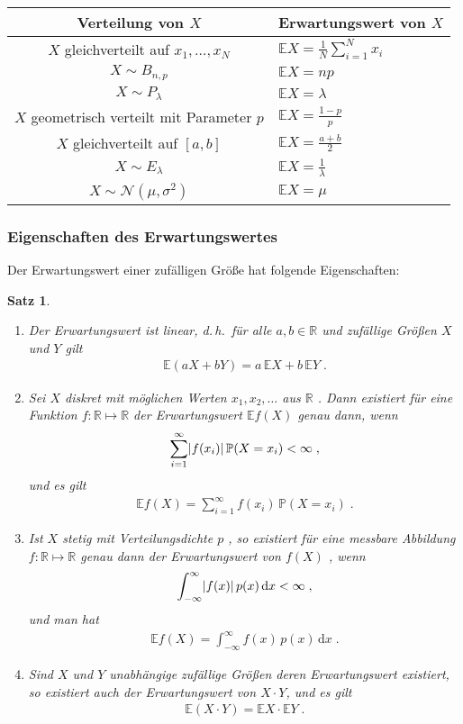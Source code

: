 \documentclass[ngerman,draft,parskip=half,twoside]{scrartcl}
\newtheorem{thm}{Satz}[section]
\DeclarePairedDelimiter{\abs}{\lvert}{\rvert}
\newcommand*{\R}{\mathbb{R}}      %
\newcommand*{\E}{\mathbb{E}}        %
\newcommand*{\WKM}{\mathbb{P}}      %
\begin{document}
{\renewcommand{\arraystretch}{1.4}
\begin{center}
\begin{tabular}{|c|l|}\hline
\bf Verteilung von $X$& \bf Erwartungswert von $X$\\ \hline\hline
$X$ gleichverteilt auf $x_1,\ldots,x_N$& $\E X=\frac{1}{N}\sum_{i=1}^N x_i$\\ \hline
$X\sim B_{n,p}$& $\E X= n p$\\ \hline
$X\sim P_\lambda$&$\E X= \lambda$\\ \hline
$X$ geometrisch verteilt mit Parameter $p$& $\E X = \frac{1-p}{p}$\\ \hline
$X$ gleichverteilt auf $[a,b]$& $\E X= \frac{a+b}{2}$\\ \hline
$X\sim E_\lambda$& $\E X = \frac{1}{\lambda}$\\ \hline
$X\sim \mathcal N(\mu,\sigma^2)$&$ \E X = \mu$\\ \hline
\end{tabular}
\end{center}
}
\subsubsection{Eigenschaften des Erwartungswertes}
Der Erwartungswert einer zufälligen Größe hat folgende Eigenschaften:
\begin{thm}~
\begin{enumerate}
\item
Der Erwartungswert ist linear, d.\,h.~für alle $a,b\in\R$ und zufällige Größen $X$ und $Y$
gilt
  \begin{gather*}
    \E(a X+ b Y) = a\,\E X + b\, \E Y\;.
  \end{gather*}
\item
Sei  $X$ diskret mit möglichen Werten $x_1,x_2,\ldots$ aus $\R$ .
Dann existiert für eine Funktion $f \colon\R\mapsto\R$
der Erwartungswert $\E f(X)$ genau dann, wenn
  \begin{gather*}
    \sum_{i=1}^\infty \abs{f(x_i)}\,\WKM(X=x_i)<\infty\;,
  \end{gather*}
und es gilt
  \begin{gather*}
    \E f(X)=\sum_{i=1}^\infty f(x_i)\,\WKM(X=x_i)\;.
  \end{gather*}
\item
Ist $X$ stetig mit Verteilungsdichte $p$ , so existiert für eine messbare
Abbildung $f \colon\R\mapsto\R$ genau dann der Erwartungswert von $f(X)$ , wenn
  \begin{gather*}
    \int_{-\infty}^\infty \abs{f(x)}\,p(x)\,\mathrm d x<\infty\;,
  \end{gather*}
und man hat
  \begin{gather*}
    \E f(X)=\int_{-\infty}^\infty  f(x) \,p(x)\,\mathrm d x\;.
  \end{gather*}
\item
Sind $X$ und $Y$ unabhängige zufällige Größen deren Erwartungswert existiert,
so existiert auch der Erwartungswert von $X\cdot Y$, und es gilt
  \begin{gather*}
    \E(X\cdot Y)= \E X \cdot \E Y\;.
  \end{gather*}
\end{enumerate}
\end{thm}
\end{document}
